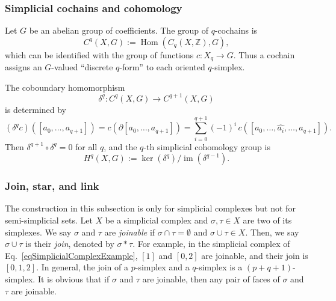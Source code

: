 \documentclass[reprint, amsmath, amssymb, showpacs, floatfix, longbibliography, aps, twocolumn, superscriptaddress, nofootinbib]{revtex4-2}
\newcommand{\ZZ}{{\mathbb Z}}
\theoremstyle{definition}
\begin{document}
\subsubsection*{Simplicial cochains and cohomology}

Let $G$ be an abelian group of coefficients.  
The group of $q$-cochains is
\[
C^q(X,G) := \operatorname{Hom}(C_q(X,\ZZ),G),
\]
which can be identified with the group of functions $c\colon X_q\to G$.
Thus a cochain assigns an $G$-valued “discrete $q$-form” to each oriented $q$-simplex.

The coboundary homomorphism
\[
\delta^q \colon C^q(X,G) \longrightarrow C^{q+1}(X,G)
\]
is determined by
\[
(\delta^q c)([a_0,\dots,a_{q+1}])
=c(\partial[a_0,\dots,a_{q+1}]) =\sum_{i=0}^{q+1} (-1)^i\, c([a_0,\dots,\widehat{a_i},\dots,a_{q+1}]).
\]
Then $\delta^{q+1}\circ\delta^q = 0$ for all $q$, and the $q$-th simplicial cohomology group is
\[
H^q(X,G) := \ker(\delta^q)\big/\operatorname{im}(\delta^{q-1}).
\]

\subsubsection*{Join, star, and link}

The construction in this subsection is only for simplicial complexes but not for semi-simplicial sets. Let $X$ be a simplicial complex and $\sigma,\tau\in X$ are two of its simplexes. We say $\sigma$ and $\tau$ are \textit{joinable} if $\sigma\cap \tau=\emptyset$ and $\sigma\cup \tau\in X$. Then, we say $\sigma\cup\tau$ is their \textit{join}, denoted by $\sigma*\tau$. For example, in the simplicial complex of Eq.~\eqref{eqSimplicialComplexExample}, $[1]$ and $[0,2]$ are joinable, and their join is $[0,1,2]$. In general, the join of a $p$-simplex and a $q$-simplex is a $(p+q+1)$-simplex. It is obvious that if $\sigma$ and $\tau$ are joinable, then any pair of faces of $\sigma$ and $\tau$ are joinable.
\end{document}

